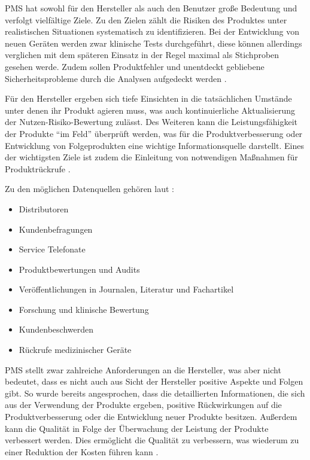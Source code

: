 \documentclass[a4paper,12pt]{report}
\begin{document}
\ac{PMS} hat sowohl für den Hersteller als auch den Benutzer große Bedeutung und verfolgt vielfältige Ziele. Zu den Zielen zählt die Risiken des Produktes unter realistischen Situationen systematisch zu identifizieren. Bei der Entwicklung von neuen Geräten werden zwar klinische Tests durchgeführt, diese können allerdings verglichen mit dem späteren Einsatz in der Regel maximal als Stichproben gesehen werde. Zudem sollen Produktfehler und unentdeckt gebliebene Sicherheitsprobleme durch die Analysen aufgedeckt werden \citep[vgl.][]{Johner2017}.

Für den Hersteller ergeben sich tiefe Einsichten in die tatsächlichen Umstände unter denen ihr Produkt agieren muss, was auch kontinuierliche Aktualisierung der Nutzen-Risiko-Bewertung zulässt. Des Weiteren kann die Leistungsfähigkeit der Produkte "`im Feld"' überprüft werden, was für die Produktverbesserung oder Entwicklung von Folgeprodukten eine wichtige Informationsquelle darstellt. Eines der wichtigsten Ziele ist zudem die Einleitung von notwendigen Maßnahmen für Produktrückrufe \citep[vgl.][]{Johner2017}.

Zu den möglichen Datenquellen gehören laut \citep[vgl.][S. 285-288]{Abuhav2012}:
\begin{itemize}
\item Distributoren
\item Kundenbefragungen
\item Service Telefonate
\item Produktbewertungen und Audits
\item Veröffentlichungen in Journalen, Literatur und Fachartikel
\item Forschung und klinische Bewertung
\item Kundenbeschwerden
\item Rückrufe medizinischer Geräte
\end{itemize}

\ac{PMS} stellt zwar zahlreiche Anforderungen an die Hersteller, was aber nicht bedeutet, dass es nicht auch aus Sicht der Hersteller positive Aspekte und Folgen gibt. So wurde bereits angesprochen, dass die detaillierten Informationen, die sich aus der Verwendung der Produkte ergeben, positive Rückwirkungen auf die Produktverbesserung oder die Entwicklung neuer Produkte besitzen. Außerdem kann die Qualität in Folge der Überwachung der Leistung der Produkte verbessert werden. Dies ermöglicht die Qualität zu verbessern, was wiederum zu einer Reduktion der Kosten führen kann \citep[vgl.][S. 2]{Pugh2017}.
\end{document}
